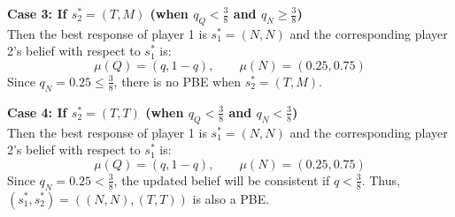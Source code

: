 \documentclass[twoside]{article}
\theoremstyle{definitionstyle}
\begin{document}
\vspace{0.5em}
\noindent\textbf{Case 3: If $s_2^* = (T, M)$ (when $q_Q < \frac{3}{8}$ and $q_N \ge \frac{3}{8}$)} \\
Then the best response of player 1 is $s_1^* = (N, N)$ and the corresponding player 2’s belief with respect to $s_1^*$ is:
$$\mu(Q) = (q, 1 - q), \qquad \mu(N) = (0.25, 0.75)$$
Since $q_N = 0.25 \le \frac{3}{8}$, there is no PBE when $s_2^* = (T, M)$.

\vspace{0.5em}
\noindent\textbf{Case 4: If $s_2^* = (T, T)$ (when $q_Q < \frac{3}{8}$ and $q_N < \frac{3}{8}$)} \\
Then the best response of player 1 is $s_1^* = (N, N)$ and the corresponding player 2’s belief with respect to $s_1^*$ is:
$$\mu(Q) = (q, 1 - q), \qquad \mu(N) = (0.25, 0.75)$$
Since $q_N = 0.25 < \frac{3}{8}$, the updated belief will be consistent if $q < \frac{3}{8}$. Thus, $(s_1^*, s_2^*) = ((N, N), (T, T))$ is also a PBE.
\end{document}
